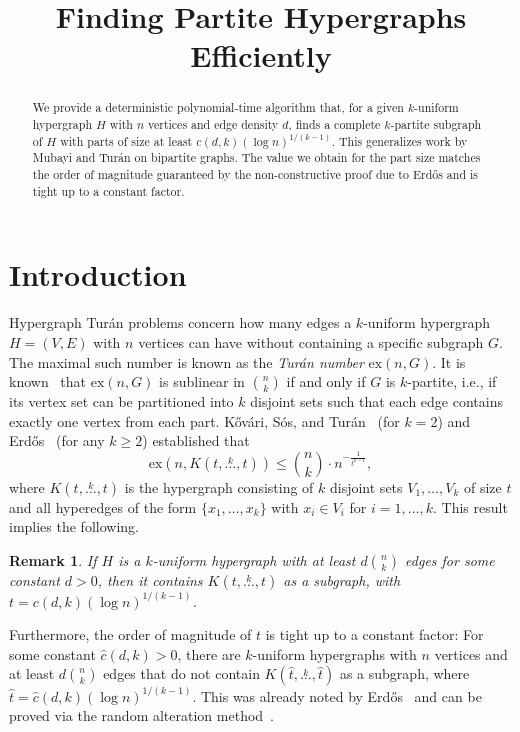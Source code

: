 \documentclass{amsart}
\title{Finding Partite Hypergraphs Efficiently}
\newcommand{\ex}[2]{\ensuremath{\mathrm{ex}(#1, #2)}}
\newcommand{\compoverset}[2]{\ensuremath{K(#2, \overset{#1}{\dots}, #2)}}
\newtheorem{remark}[subsection]{Remark}
\begin{document}
    \begin{abstract}
We provide a deterministic polynomial-time algorithm that, for a given $k$-uniform hypergraph $H$ with $n$ vertices and edge density $d$,
finds a complete $k$-partite subgraph of $H$ with parts of size at least ${c(d, k)(\log n)^{1/(k-1)}}$.
This generalizes work by Mubayi and Tur\'{a}n on bipartite graphs.
The value we obtain for the part size matches the order of magnitude guaranteed by the non-constructive proof due to
Erd\H{o}s and is tight up to a constant factor.
\end{abstract}

\maketitle


\section{Introduction}\label{sec:introduction}

Hypergraph Tur\'{a}n problems concern how many edges a $k$-uniform hypergraph $H = (V, E)$ with $n$ vertices can have without containing a specific subgraph $G$.
The maximal such number is known as the \emph{Tur\'{a}n number} $\ex{n}{G}$.
It is known~\cite{keevash2011hypergraph}
that $\ex{n}{G}$ is sublinear in $\binom{n}{k}$ if and only if $G$ is $k$-partite, i.e.,
if its vertex set can be partitioned into $k$ disjoint sets such that each edge contains exactly one vertex from each part.
K\H{o}v\'{a}ri, S\'{o}s, and Tur\'{a}n~\cite{Kovari1954} (for $k=2$) and
Erd\H{o}s~\cite{Erdos1964} (for any $k \geq 2$) established that
\[
    \ex{n}{\compoverset{k}{t}} \leq \binom{n}{k} \cdot n^{-\frac{1}{t^{k-1}}},
\]
where $\compoverset{k}{t}$ is the hypergraph consisting of $k$ disjoint sets $V_1, \dots, V_k$ of size $t$
and all hyperedges of the form $\{x_1, \dots, x_k\}$ with $x_i \in V_i$ for $i = 1, \dots, k$.
This result implies the following.

\begin{remark} \label{rk:order}
    If $H$ is a $k$-uniform hypergraph with at least $d \binom{n}{k}$ edges for some constant $d > 0$, then it contains $\compoverset{k}{t}$
    as a subgraph, with $t = c(d, k) (\log n)^{1/(k-1)}$.
\end{remark}

Furthermore, the order of magnitude of $t$ is tight up to a constant factor:
For some constant $\hat{c}(d, k) > 0$,
there are $k$-uniform hypergraphs with $n$ vertices and at least $d \binom{n}{k}$ edges
that do not contain $\compoverset{k}{\hat{t}}$ as a subgraph, where
$\hat{t} = \hat{c}(d, k)(\log n)^{1/(k-1)}$.
This was already noted by Erd\H{o}s~\cite{Erdos1964} and can be proved via the random alteration method~\cite{alon2016probabilistic}.
\end{document}
